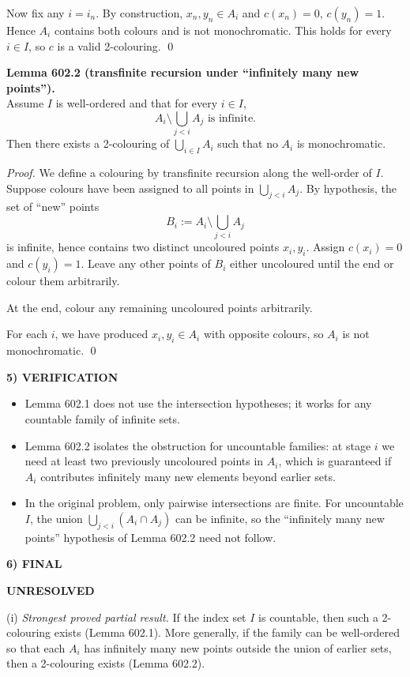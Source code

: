 Now fix any $i=i_n$. By construction, $x_n,y_n\in A_i$ and $c(x_n)=0$, $c(y_n)=1$. Hence $A_i$ contains both colours and is not monochromatic.
This holds for every $i\in I$, so $c$ is a valid 2-colouring. \qed

\medskip
\noindent\textbf{Lemma 602.2 (transfinite recursion under ``infinitely many new points'').}\\
Assume $I$ is well-ordered and that for every $i\in I$,
\[
A_i\setminus\bigcup_{j<i}A_j\text{ is infinite.}
\]
Then there exists a 2-colouring of $\bigcup_{i\in I}A_i$ such that no $A_i$ is monochromatic.

\noindent\emph{Proof.}
We define a colouring by transfinite recursion along the well-order of $I$.
Suppose colours have been assigned to all points in $\bigcup_{j<i}A_j$.
By hypothesis, the set of ``new'' points
\[
B_i:=A_i\setminus\bigcup_{j<i}A_j
\]
is infinite, hence contains two distinct uncoloured points $x_i,y_i$.
Assign $c(x_i)=0$ and $c(y_i)=1$.
Leave any other points of $B_i$ either uncoloured until the end or colour them arbitrarily.

At the end, colour any remaining uncoloured points arbitrarily.

For each $i$, we have produced $x_i,y_i\in A_i$ with opposite colours, so $A_i$ is not monochromatic. \qed

\noindent\textbf{5) VERIFICATION}\par
\begin{itemize}
\item Lemma 602.1 does not use the intersection hypotheses; it works for any countable family of infinite sets.
\item Lemma 602.2 isolates the obstruction for uncountable families: at stage $i$ we need at least two previously uncoloured points in $A_i$, which is guaranteed if $A_i$ contributes infinitely many new elements beyond earlier sets.
\item In the original problem, only pairwise intersections are finite. For uncountable $I$, the union $\bigcup_{j<i}(A_i\cap A_j)$ can be infinite, so the ``infinitely many new points'' hypothesis of Lemma 602.2 need not follow.
\end{itemize}

\noindent\textbf{6) FINAL}\par
\textbf{UNRESOLVED}

(i) \emph{Strongest proved partial result.} If the index set $I$ is countable, then such a 2-colouring exists (Lemma 602.1). More generally, if the family can be well-ordered so that each $A_i$ has infinitely many new points outside the union of earlier sets, then a 2-colouring exists (Lemma 602.2).

